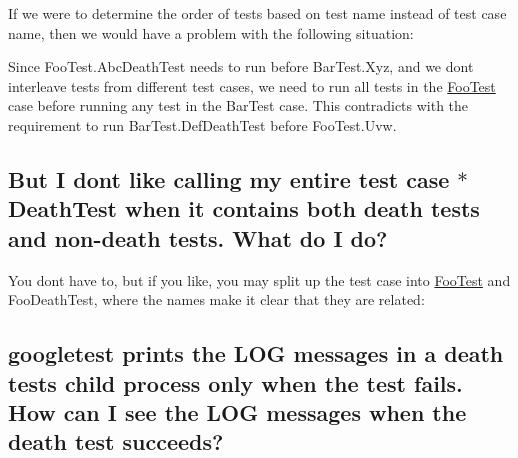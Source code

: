 If we were to determine the order of tests based on test name instead of test case name, then we would have a problem with the following situation\+:


\begin{DoxyCode}{0}
\DoxyCodeLine{}
\end{DoxyCode}


Since {\ttfamily Foo\+Test.\+Abc\+Death\+Test} needs to run before {\ttfamily Bar\+Test.\+Xyz}, and we don\textquotesingle{}t interleave tests from different test cases, we need to run all tests in the {\ttfamily \mbox{\hyperlink{class_foo_test}{Foo\+Test}}} case before running any test in the {\ttfamily Bar\+Test} case. This contradicts with the requirement to run {\ttfamily Bar\+Test.\+Def\+Death\+Test} before {\ttfamily Foo\+Test.\+Uvw}.

\subsection*{But I don\textquotesingle{}t like calling my entire test case $\ast$\+Death\+Test when it contains both death tests and non-\/death tests. What do I do?}

You don\textquotesingle{}t have to, but if you like, you may split up the test case into {\ttfamily \mbox{\hyperlink{class_foo_test}{Foo\+Test}}} and {\ttfamily Foo\+Death\+Test}, where the names make it clear that they are related\+:


\begin{DoxyCode}{0}
\DoxyCodeLine{}
\DoxyCodeLine{}
\DoxyCodeLine{}
\end{DoxyCode}


\subsection*{googletest prints the L\+OG messages in a death test\textquotesingle{}s child process only when the test fails. How can I see the L\+OG messages when the death test succeeds?}

